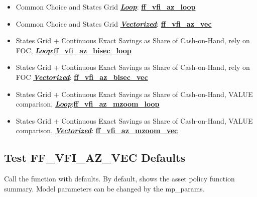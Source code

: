\documentclass[
]{book}
\begin{document}
\begin{itemize}
\item
  Common Choice and States Grid \underline{\textbf{\emph{Loop}}}:
  \href{https://github.com/FanWangEcon/MEconTools/blob/master/MEconTools/vfi/ff_vfi_az_loop.m}{\textbf{ff\_vfi\_az\_loop}}
\item
  Common Choice and States Grid \underline{\textbf{\emph{Vectorized}}}:
  \href{https://github.com/FanWangEcon/MEconTools/blob/master/MEconTools/vfi/ff_vfi_az_vec.m}{\textbf{ff\_vfi\_az\_vec}}
\item
  States Grid + Continuous Exact Savings as Share of Cash-on-Hand,
  rely on FOC, \underline{\textbf{\emph{Loop}}}:\href{https://github.com/FanWangEcon/MEconTools/blob/master/MEconTools/vfi/ff_vfi_az_bisec_loop.m}{\textbf{ff\_vfi\_az\_bisec\_loop}}
\item
  States Grid + Continuous Exact Savings as Share of Cash-on-Hand,
  rely on FOC \underline{\textbf{\emph{Vectorized}}}:
  \href{https://github.com/FanWangEcon/MEconTools/blob/master/MEconTools/vfi/ff_vfi_az_bisec_vec.m}{\textbf{ff\_vfi\_az\_bisec\_vec}}
\item
  States Grid + Continuous Exact Savings as Share of Cash-on-Hand,
  VALUE comparison, \underline{\textbf{\emph{Loop}}}:\href{https://github.com/FanWangEcon/MEconTools/blob/master/MEconTools/vfi/ff_vfi_az_mzoom_loop.m}{\textbf{ff\_vfi\_az\_mzoom\_loop}}
\item
  States Grid + Continuous Exact Savings as Share of Cash-on-Hand,
  VALUE comparison, \underline{\textbf{\emph{Vectorized}}}:
  \href{https://github.com/FanWangEcon/MEconTools/blob/master/MEconTools/vfi/ff_vfi_az_mzoom_vec.m}{\textbf{ff\_vfi\_az\_mzoom\_vec}}
\end{itemize}

\hypertarget{test-ff_vfi_az_vec-defaults}{%
\subsection{Test FF\_VFI\_AZ\_VEC Defaults}\label{test-ff_vfi_az_vec-defaults}}

Call the function with defaults. By default, shows the asset policy
function summary. Model parameters can be changed by the mp\_params.
\end{document}
